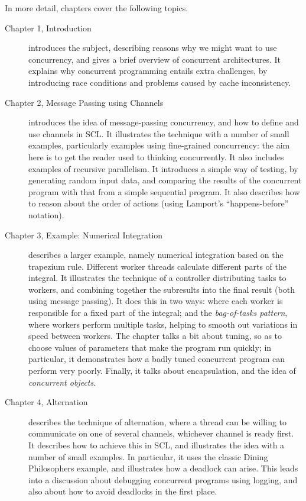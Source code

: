 \documentclass[12pt,a4paper]{article}
\begin{document}
In more detail, chapters cover the following topics.
%
\begin{description}
\item[Chapter 1, Introduction] introduces the subject, describing reasons why
  we might want to use concurrency, and gives a brief overview of concurrent
  architectures.  It explains why concurrent programming entails extra
  challenges, by introducing race conditions and problems caused by cache
  inconsistency.

\item[Chapter 2, Message Passing using Channels] introduces the idea of
  message-passing concurrency, and how to define and use channels in SCL{}.  It
  illustrates the technique with a number of small examples, particularly
  examples using fine-grained concurrency: the aim here is to get the reader
  used to thinking concurrently.  It also includes examples of recursive
  parallelism.  It introduces a simple way of testing, by generating random
  input data, and comparing the results of the concurrent program with that
  from a simple sequential program.  It also describes how to reason about the
  order of actions (using Lamport's ``happens-before'' notation).

\item[Chapter 3, Example: Numerical Integration] describes a larger example,
  namely numerical integration based on the trapezium rule.  Different worker
  threads calculate different parts of the integral.  It illustrates the
  technique of a controller distributing tasks to workers, and combining
  together the subresults into the final result (both using message passing).
  It does this in two ways: where each worker is responsible for a fixed part
  of the integral; and the \emph{bag-of-tasks pattern}, where workers perform
  multiple tasks, helping to smooth out variations in speed between workers.
  The chapter talks a bit about tuning, so as to choose values of parameters
  that make the program run quickly; in particular, it demonstrates how a
  badly tuned concurrent program can perform very poorly.  Finally, it talks
  about encapsulation, and the idea of \emph{concurrent objects}.

\item[Chapter 4, Alternation] describes the technique of alternation, where a
  thread can be willing to communicate on one of several channels, whichever
  channel is ready first.  It describes how to achieve this in SCL, and
  illustrates the idea with a number of small examples.  In particular, it
  uses the classic Dining Philosophers example, and illustrates how a deadlock
  can arise.  This leads into a discussion about debugging concurrent
  programs using logging, and also about how to avoid deadlocks in the first
  place. 


\end{description}
\end{document}
